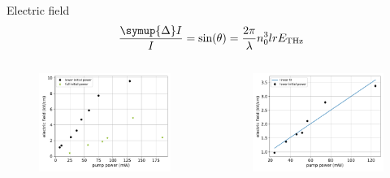 \documentclass[aspectratio=1610, 9pt]{beamer}
\begin{document}
\begin{frame}{Electric field}
  \begin{equation}
    \frac{\symup{\Delta}I}{I} = \text{sin}(\theta) = \frac{2\pi}{\lambda} n_0^3 l r E_\text{THz}
  \end{equation}
  \begin{columns}
    \begin{column}{.5\textwidth}
  \begin{figure}
    \includegraphics[width=\textwidth]{images/eltric_field_ZnTe.pdf}
  \end{figure}
  \end{column}
  \begin{column}{.5\textwidth}
    \begin{figure}
      \includegraphics[width=\textwidth]{images/eltric_field_GaP.pdf}
    \end{figure}    
  \end{column}
  \end{columns}
\end{frame}
\end{document}
